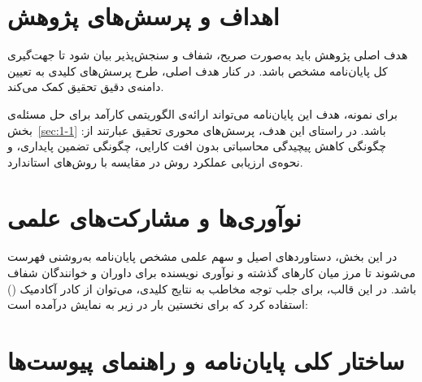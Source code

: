 \section{اهداف و پرسش‌های پژوهش}\label{sec:1-3}

هدف اصلی پژوهش باید به‌صورت صریح، شفاف و سنجش‌پذیر بیان شود تا جهت‌گیری کل پایان‌نامه مشخص باشد. در کنار هدف اصلی، طرح پرسش‌های کلیدی به تعیین دامنه‌ی دقیق تحقیق کمک می‌کند.

برای نمونه، هدف این پایان‌نامه می‌تواند ارائه‌ی الگوریتمی کارآمد برای حل مسئله‌ی بخش~\ref{sec:1-1} باشد. در راستای این هدف، پرسش‌های محوری تحقیق عبارتند از: چگونگی کاهش پیچیدگی محاسباتی بدون افت کارایی، چگونگی تضمین پایداری، و نحوه‌ی ارزیابی عملکرد روش در مقایسه با روش‌های استاندارد.


\section{نوآوری‌ها و مشارکت‌های علمی}\label{sec:1-4}

در این بخش، دستاوردهای اصیل و سهم علمی مشخص پایان‌نامه به‌روشنی فهرست می‌شوند تا مرز میان کارهای گذشته و نوآوری نویسنده برای داوران و خوانندگان شفاف باشد. در این قالب، برای جلب توجه مخاطب به نتایج کلیدی، می‌توان از کادر آکادمیک () استفاده کرد که برای نخستین بار در زیر به نمایش درآمده است:

\vspace{0.3cm}
\vspace{0.3cm}


\section{ساختار کلی پایان‌نامه و راهنمای پیوست‌ها}\label{sec:1-5}

